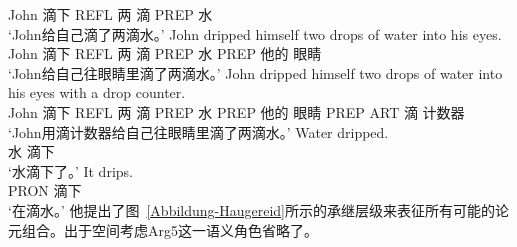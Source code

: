 \begin{exe}
\begin{xlist}[iv.]
\begin{exe}
\begin{xlist}[iv.]
     John 滴下 REFL 两 滴 PREP 水\\
\glt `John给自己滴了两滴水。' 
\ex
\gll John dripped himself two drops of water into his eyes. \\
     John 滴下 REFL 两 滴 PREP 水 PREP 他的 眼睛\\
\glt `John给自己往眼睛里滴了两滴水。' 
\ex
\gll John dripped himself two drops of water into his eyes with a drop counter. \\
     John 滴下 REFL 两 滴 PREP 水 PREP 他的 眼睛 PREP ART 滴 计数器\\
\glt `John用滴计数器给自己往眼睛里滴了两滴水。' 
\ex
\gll Water dripped. \\
     水 滴下\\
\glt `水滴下了。' 
\ex
\gll It drips. \\
     PRON 滴下\\
\glt `在滴水。' 
\zl
他提出了图~\ref{Abbildung-Haugereid}所示的承继层级来表征所有可能的论元组合。出于空间考虑Arg5这一语义角色省略了。


\end{xlist}
\end{exe}
\end{xlist}
\end{exe}
